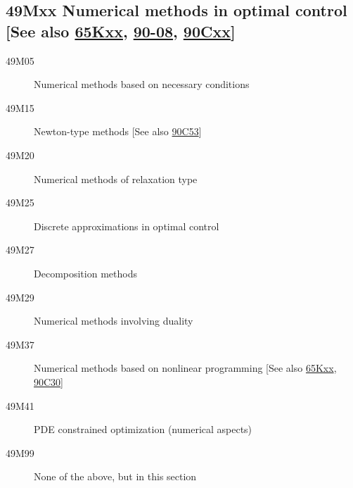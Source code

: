 \documentclass[letterpaper]{article}
\begin{document}
\subsection*{49Mxx  Numerical methods in  optimal control [See also \hyperref[65Kxx]{65Kxx}, \hyperref[90-08]{90-08}, \hyperref[90Cxx]{90Cxx}] }\label{49Mxx}
\begin{description}  
\item [49M05]\label{49M05} Numerical methods based on necessary conditions
\item [49M15]\label{49M15} Newton-type methods [See also \hyperref[90C53]{90C53}]
\item [49M20]\label{49M20} Numerical methods of relaxation type 
\item [49M25]\label{49M25} Discrete approximations in optimal control
\item [49M27]\label{49M27} Decomposition methods 
\item [49M29]\label{49M29} Numerical methods involving duality 
\item [49M37]\label{49M37} Numerical methods based on nonlinear programming [See also \hyperref[65Kxx]{65Kxx}, \hyperref[90C30]{90C30}]
\item [49M41]\label{49M41} PDE constrained optimization (numerical aspects)
\item [49M99]\label{49M99} None of the above, but in this section
\end{description}
\end{document}
